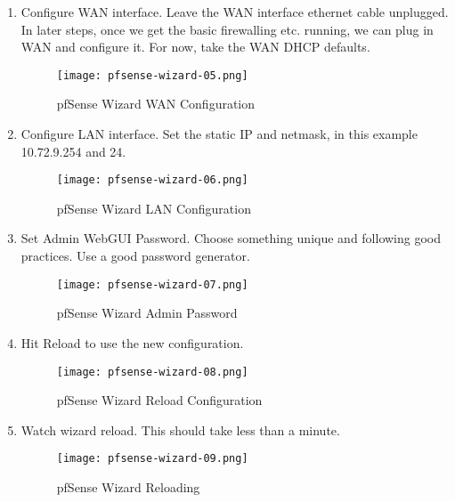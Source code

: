 \begin{enumerate}
 \item Configure WAN interface. Leave the WAN interface ethernet cable unplugged. In later steps, once we get the basic firewalling etc. running, we can plug in WAN and configure it. For now, take the WAN DHCP defaults.
\begin{figure}[h!]
\begin{center}
\texttt{[image: pfsense-wizard-05.png]}
 \caption{pfSense Wizard WAN Configuration}
 \label{fig:pfsense-wizard-05}
\end{center}
\end{figure}

 \item Configure LAN interface. Set the static IP and netmask, in this example 10.72.9.254 and 24.
\begin{figure}[h!]
\begin{center}
\texttt{[image: pfsense-wizard-06.png]}
 \caption{pfSense Wizard LAN Configuration}
 \label{fig:pfsense-wizard-06}
\end{center}
\end{figure}

 \item Set Admin WebGUI Password. Choose something unique and following good practices. Use a good password generator.
\begin{figure}[h!]
\begin{center}
\texttt{[image: pfsense-wizard-07.png]}
 \caption{pfSense Wizard Admin Password}
 \label{fig:pfsense-wizard-07}
\end{center}
\end{figure}

 \item Hit Reload to use the new configuration.
\begin{figure}[h!]
\begin{center}
\texttt{[image: pfsense-wizard-08.png]}
 \caption{pfSense Wizard Reload Configuration}
 \label{fig:pfsense-wizard-08}
\end{center}
\end{figure}

 \item Watch wizard reload. This should take less than a minute.
\begin{figure}[h!]
\begin{center}
\texttt{[image: pfsense-wizard-09.png]}
 \caption{pfSense Wizard Reloading}
 \label{fig:pfsense-wizard-09}
\end{center}
\end{figure}


\end{enumerate}
